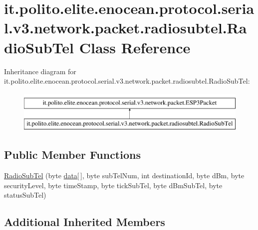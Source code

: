 \hypertarget{classit_1_1polito_1_1elite_1_1enocean_1_1protocol_1_1serial_1_1v3_1_1network_1_1packet_1_1radiosubtel_1_1_radio_sub_tel}{}\section{it.\+polito.\+elite.\+enocean.\+protocol.\+serial.\+v3.\+network.\+packet.\+radiosubtel.\+Radio\+Sub\+Tel Class Reference}
\label{classit_1_1polito_1_1elite_1_1enocean_1_1protocol_1_1serial_1_1v3_1_1network_1_1packet_1_1radiosubtel_1_1_radio_sub_tel}
Inheritance diagram for it.\+polito.\+elite.\+enocean.\+protocol.\+serial.\+v3.\+network.\+packet.\+radiosubtel.\+Radio\+Sub\+Tel\+:\begin{figure}[H]
\begin{center}
\leavevmode
\includegraphics[height=2.000000cm]{classit_1_1polito_1_1elite_1_1enocean_1_1protocol_1_1serial_1_1v3_1_1network_1_1packet_1_1radiosubtel_1_1_radio_sub_tel}
\end{center}
\end{figure}
\subsection*{Public Member Functions}
\begin{DoxyCompactItemize}
\item 
\hyperlink{classit_1_1polito_1_1elite_1_1enocean_1_1protocol_1_1serial_1_1v3_1_1network_1_1packet_1_1radiosubtel_1_1_radio_sub_tel_a08883ebe700df5f64a8faa126876e5b7}{Radio\+Sub\+Tel} (byte \hyperlink{classit_1_1polito_1_1elite_1_1enocean_1_1protocol_1_1serial_1_1v3_1_1network_1_1packet_1_1_e_s_p3_packet_a3b52eafc90090190d976e3ddeae2b591}{data}\mbox{[}$\,$\mbox{]}, byte sub\+Tel\+Num, int destination\+Id, byte d\+Bm, byte security\+Level, byte time\+Stamp, byte tick\+Sub\+Tel, byte d\+Bm\+Sub\+Tel, byte status\+Sub\+Tel)
\end{DoxyCompactItemize}
\subsection*{Additional Inherited Members}


